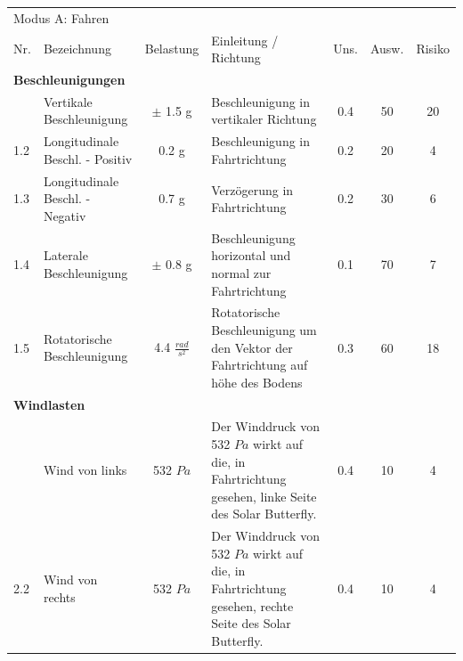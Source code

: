 \begin{landscape}%
  \centering %
  \begin{tabularx}{\linewidth}{llcXccc}
    \multicolumn{7}{l}{\LARGE{Modus A: Fahren}}\\
    \thickhline
    Nr. & Bezeichnung & Belastung & Einleitung / Richtung & Uns. & Ausw. & Risiko\\
    \hline
    \multicolumn{7}{l}{\textbf{Beschleunigungen}}\\
    \thickhline
    1.1 & Vertikale Beschleunigung         & $\pm$ 1.5 g           & Beschleunigung in vertikaler Richtung & 0.4 & 50 & 20\\
    1.2 & Longitudinale Beschl. - Positiv  & 0.2 g                 & Beschleunigung in Fahrtrichtung & 0.2 & 20 & 4\\
    1.3 & Longitudinale Beschl. - Negativ  & 0.7 g                 & Verzögerung in Fahrtrichtung & 0.2 & 30 & 6\\
    1.4 & Laterale Beschleunigung          & $\pm$ 0.8 g           & Beschleunigung horizontal und normal zur Fahrtrichtung & 0.1 & 70 & 7\\
    1.5 & Rotatorische Beschleunigung      & 4.4 $\frac{rad}{s^2}$ & Rotatorische Beschleunigung um den Vektor der Fahrtrichtung auf höhe des Bodens & 0.3 & 60 & 18\\

    \multicolumn{7}{l}{\textbf{Windlasten}}\\
    \thickhline
    2.1 & Wind von links & 532 $Pa$ & Der Winddruck von 532 $Pa$ wirkt auf die, in Fahrtrichtung gesehen, linke Seite des Solar Butterfly. %
    & 0.4 & 10 & 4\\
    2.2 & Wind von rechts & 532 $Pa$ & Der Winddruck von 532 $Pa$ wirkt auf die, in Fahrtrichtung gesehen, rechte Seite des Solar Butterfly. %
    & 0.4 & 10 & 4\\


\end{tabularx}
\end{landscape}
